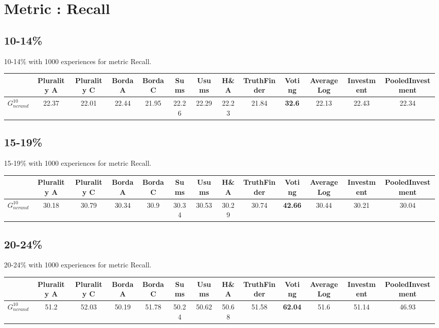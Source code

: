 \documentclass{article}
\newcommand{\graph}[2]{$G_{#1}^{#2}$}
\begin{document}
\section{Metric : Recall}

\newpage

\subsection{10-14\%}

10-14\% with 1000 experiences for metric Recall.

\noindent\begin{tabular}{|l|c|c|c|c|c|c|c|c|c|c|c|c|}
\hline
& Plurality A& Plurality C& Borda A& Borda C& Sums& Usums& H\&A& TruthFinder& Voting& AverageLog& Investment& PooledInvestment\\
\hline
\graph{ncrand}{10} &22.37&22.01&22.44&21.95&22.26&22.29&22.23&21.84&\textbf{32.6}&22.13&22.43&22.34\\
\hline
\end{tabular}
\newpage

\subsection{15-19\%}

15-19\% with 1000 experiences for metric Recall.

\noindent\begin{tabular}{|l|c|c|c|c|c|c|c|c|c|c|c|c|}
\hline
& Plurality A& Plurality C& Borda A& Borda C& Sums& Usums& H\&A& TruthFinder& Voting& AverageLog& Investment& PooledInvestment\\
\hline
\graph{ncrand}{10} &30.18&30.79&30.34&30.9&30.34&30.53&30.29&30.74&\textbf{42.66}&30.44&30.21&30.04\\
\hline
\end{tabular}
\newpage

\subsection{20-24\%}

20-24\% with 1000 experiences for metric Recall.

\noindent\begin{tabular}{|l|c|c|c|c|c|c|c|c|c|c|c|c|}
\hline
& Plurality A& Plurality C& Borda A& Borda C& Sums& Usums& H\&A& TruthFinder& Voting& AverageLog& Investment& PooledInvestment\\
\hline
\graph{ncrand}{10} &51.2&52.03&50.19&51.78&50.24&50.62&50.68&51.58&\textbf{62.04}&51.6&51.14&46.93\\
\hline
\end{tabular}
\newpage
\end{document}
